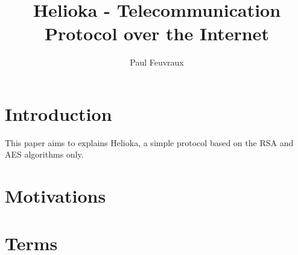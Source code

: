 \documentclass[a4paper,10pt]{article}
\title{Helioka - Telecommunication Protocol over the Internet}
\author{Paul Feuvraux}
\begin{document}
\maketitle

\section{Introduction}
This paper aims to explains Helioka, a simple protocol based on the RSA and AES algorithms only.

\section{Motivations}

\section{Terms}
\end{document}
